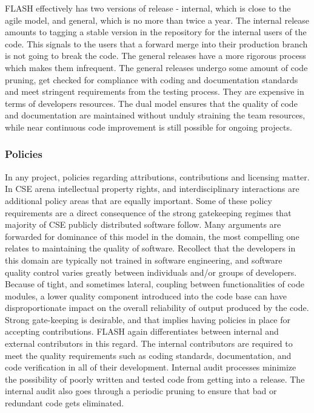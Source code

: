 FLASH effectively has two versions of release - internal, which
is close to the agile model, and general, which is no more than twice
a year. The internal release amounts to tagging a stable version in
the repository for the internal users of the code. This signals to
the users that a forward merge into their production branch is not
going to break the code. The general releases have a more rigorous
process which makes them infrequent. The general releases undergo some
amount of code pruning, get checked for compliance with coding and
documentation standards and meet stringent requirements from the testing
process. They are expensive in terms of developers resources. The
dual model ensures that the quality of code and documentation are
maintained without unduly straining the team resources, while
near continuous code improvement is still possible for ongoing
projects. 
 
\subsubsection{Policies}
\label{sec:FLASHPolicies}
In any project, policies regarding attributions, contributions and
licensing matter. In CSE arena intellectual property rights,
and interdisciplinary interactions are additional policy
areas that are equally important. Some of these policy requirements
are a direct consequence of the strong gatekeeping regimes that
majority of CSE publicly distributed software follow.  Many arguments
are forwarded for dominance of this model in the domain, the
most compelling one relates to maintaining the quality of
software. Recollect that the developers in this domain are typically
not trained in software engineering, and software quality control
varies greatly between individuals and/or groups of
developers. Because of tight, and sometimes lateral, coupling between
functionalities of code modules, a lower quality component introduced
into the code base can have disproportionate impact on the overall
reliability of output produced by the code. Strong gate-keeping is
desirable, and that implies having policies in place for accepting
contributions. FLASH again differentiates between internal and
external contributors in this regard. The internal contributors are
required to meet the quality requirements such as coding standards,
documentation, and code verification in all of their
development. Internal audit processes minimize the possibility of
poorly written and tested code from getting into a release. The internal audit also goes
through a periodic pruning to ensure that bad or redundant code gets
eliminated.  

